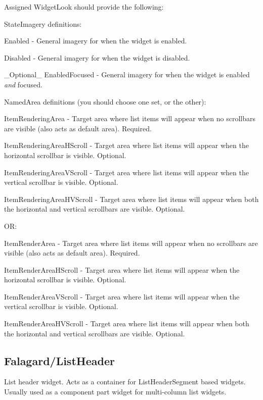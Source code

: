 Assigned Widget\+Look should provide the following\+: 
\begin{DoxyItemize}
\item State\+Imagery definitions\+: 
\begin{DoxyItemize}
\item Enabled -\/ General imagery for when the widget is enabled. 
\item Disabled -\/ General imagery for when the widget is disabled. 
\item \+\_\+\+Optional\+\_\+ Enabled\+Focused -\/ General imagery for when the widget is enabled {\itshape and} focused. 
\end{DoxyItemize}


\item Named\+Area definitions (you should choose one set, or the other)\+: 
\begin{DoxyItemize}
\item Item\+Rendering\+Area -\/ Target area where list items will appear when no scrollbars are visible (also acts as default area). Required. 
\item Item\+Rendering\+Area\+H\+Scroll -\/ Target area where list items will appear when the horizontal scrollbar is visible. Optional. 
\item Item\+Rendering\+Area\+V\+Scroll -\/ Target area where list items will appear when the vertical scrollbar is visible. Optional. 
\item Item\+Rendering\+Area\+H\+V\+Scroll -\/ Target area where list items will appear when both the horizontal and vertical scrollbars are visible. Optional. 
\end{DoxyItemize}
\item OR\+: 
\begin{DoxyItemize}
\item Item\+Render\+Area -\/ Target area where list items will appear when no scrollbars are visible (also acts as default area). Required. 
\item Item\+Render\+Area\+H\+Scroll -\/ Target area where list items will appear when the horizontal scrollbar is visible. Optional. 
\item Item\+Render\+Area\+V\+Scroll -\/ Target area where list items will appear when the vertical scrollbar is visible. Optional. 
\item Item\+Render\+Area\+H\+V\+Scroll -\/ Target area where list items will appear when both the horizontal and vertical scrollbars are visible. Optional. 
\end{DoxyItemize}
\end{DoxyItemize}\hypertarget{fal_wr_ref_fal_wr_ref_sec_8}{}\subsection{Falagard/\+List\+Header}\label{fal_wr_ref_fal_wr_ref_sec_8}
List header widget. Acts as a container for List\+Header\+Segment based widgets. Usually used as a component part widget for multi-\/column list widgets.

